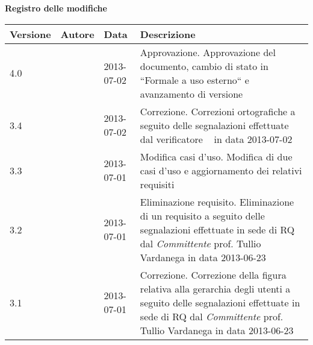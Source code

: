 \Large{\textbf{Registro delle modifiche}}\\
\normalsize

	\label{tabVers}
	\begin{longtable}{p{} p{} p{} p{}} 
	    \toprule
	    \textbf{Versione}	&	\textbf{Autore}	&	\textbf{Data}		&	\textbf{Descrizione}\\
	    \midrule
	    \midrule
	    4.0	&	\AB		&	2013-07-02		& Approvazione. \newline Approvazione del documento, cambio di stato in ``Formale a uso esterno`` e avanzamento di versione\\
	    \midrule
	    	3.4	&	\FZ		&	2013-07-02		& Correzione. \newline Correzioni ortografiche a seguito delle segnalazioni effettuate dal verificatore \EZ~ in data 2013-07-02\\
	    \midrule
	    	3.3 &	\FZ		&	2013-07-01		& Modifica casi d'uso. \newline Modifica di due casi d'uso e aggiornamento dei relativi requisiti\\
	    \midrule
	    	3.2 &	\FZ		&	2013-07-01		& Eliminazione requisito. \newline Eliminazione di un requisito a seguito delle segnalazioni effettuate in sede di RQ dal \emph{Committente} prof. Tullio Vardanega in data 2013-06-23\\
	    \midrule
	    	3.1 &	\FZ		&	2013-07-01		& Correzione. \newline Correzione della figura relativa alla gerarchia degli utenti a seguito delle segnalazioni effettuate in sede di RQ dal \emph{Committente} prof. Tullio Vardanega in data 2013-06-23\\
	    

\end{longtable}
